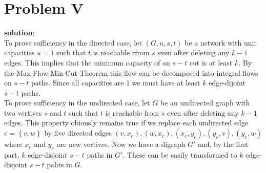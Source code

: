 \section{Problem V}
\textbf{solution}:\\
To prove sufficiency in the directed case, let $(G, u, s, t)$ be a network with unit capacities $u = 1$ such that $t$ is reachable rfrom $s$ even after deleting any $k - 1$ edges. This implies that the minimum capacity of an $s-t$ cut is at least $k$. By the Max-Flow-Min-Cut Theorem this flow can be decomposed into integral flows on $s-t$ paths. Since all capacities are 1 we must have at least $k$ edge-dijoint $s-t$ paths. \\

To prove sufficiency in the undirected case, let $G$ be an undirected graph with two vertives $s$ and $t$ such that $t$ is reachable from $s$ even after deleting any $k - 1$ edges. This property obiously remains true if we replace each undirected edge $e = \left\{ v, w \right\}$  by five directed edges $(v, x_e), (w, x_e), (x_e, y_e), (y_e, v), (y_e, w)$ where $x_e$ and $y_e$ are new vertives. Now we have a digraph $G'$ and, by the first part, $k$ edge-disjoint $s-t$ paths in $G'$. These can be easily transformed to $k$ edge-disjoint $s-t$ pahts in $G$. 